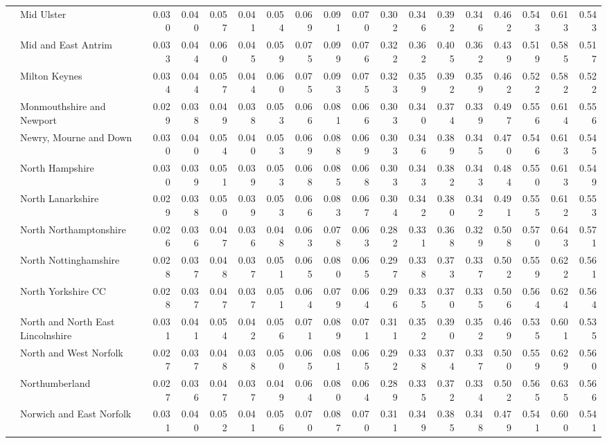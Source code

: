 \begin{tabular}{llrrrrrrrrrrrrrrrr}
 & Mid Ulster & 0.030 & 0.040 & 0.057 & 0.041 & 0.054 & 0.069 & 0.091 & 0.070 & 0.302 & 0.346 & 0.392 & 0.346 & 0.462 & 0.543 & 0.613 & 0.543 \\
 & Mid and East Antrim & 0.033 & 0.044 & 0.060 & 0.045 & 0.059 & 0.075 & 0.099 & 0.076 & 0.322 & 0.362 & 0.405 & 0.362 & 0.439 & 0.519 & 0.585 & 0.517 \\
 & Milton Keynes & 0.034 & 0.044 & 0.057 & 0.044 & 0.060 & 0.075 & 0.093 & 0.075 & 0.323 & 0.359 & 0.392 & 0.359 & 0.462 & 0.522 & 0.582 & 0.522 \\
 & Monmouthshire and Newport & 0.029 & 0.038 & 0.049 & 0.038 & 0.053 & 0.066 & 0.081 & 0.066 & 0.303 & 0.340 & 0.374 & 0.339 & 0.497 & 0.556 & 0.614 & 0.556 \\
 & Newry, Mourne and Down & 0.030 & 0.040 & 0.054 & 0.040 & 0.053 & 0.069 & 0.088 & 0.069 & 0.303 & 0.346 & 0.389 & 0.345 & 0.470 & 0.546 & 0.613 & 0.545 \\
 & North Hampshire & 0.030 & 0.039 & 0.051 & 0.039 & 0.053 & 0.068 & 0.085 & 0.068 & 0.303 & 0.343 & 0.382 & 0.343 & 0.484 & 0.550 & 0.613 & 0.549 \\
 & North Lanarkshire & 0.029 & 0.038 & 0.050 & 0.039 & 0.053 & 0.066 & 0.083 & 0.067 & 0.304 & 0.342 & 0.380 & 0.342 & 0.491 & 0.555 & 0.612 & 0.553 \\
 & North Northamptonshire & 0.026 & 0.036 & 0.047 & 0.036 & 0.048 & 0.063 & 0.078 & 0.063 & 0.282 & 0.331 & 0.368 & 0.329 & 0.508 & 0.570 & 0.643 & 0.571 \\
 & North Nottinghamshire & 0.028 & 0.037 & 0.048 & 0.037 & 0.051 & 0.065 & 0.080 & 0.065 & 0.297 & 0.338 & 0.373 & 0.337 & 0.502 & 0.559 & 0.622 & 0.561 \\
 & North Yorkshire CC & 0.028 & 0.037 & 0.047 & 0.037 & 0.051 & 0.064 & 0.079 & 0.064 & 0.296 & 0.335 & 0.370 & 0.335 & 0.506 & 0.564 & 0.624 & 0.564 \\
 & North and North East Lincolnshire & 0.031 & 0.041 & 0.054 & 0.042 & 0.056 & 0.071 & 0.089 & 0.071 & 0.311 & 0.352 & 0.390 & 0.352 & 0.469 & 0.535 & 0.601 & 0.535 \\
 & North and West Norfolk & 0.027 & 0.037 & 0.048 & 0.038 & 0.050 & 0.065 & 0.081 & 0.065 & 0.292 & 0.338 & 0.374 & 0.337 & 0.500 & 0.559 & 0.629 & 0.560 \\
 & Northumberland & 0.027 & 0.036 & 0.047 & 0.037 & 0.049 & 0.064 & 0.080 & 0.064 & 0.289 & 0.335 & 0.372 & 0.334 & 0.502 & 0.565 & 0.635 & 0.566 \\
 & Norwich and East Norfolk & 0.031 & 0.040 & 0.052 & 0.041 & 0.056 & 0.070 & 0.087 & 0.070 & 0.311 & 0.349 & 0.385 & 0.348 & 0.479 & 0.541 & 0.600 & 0.541 \\

\end{tabular}
